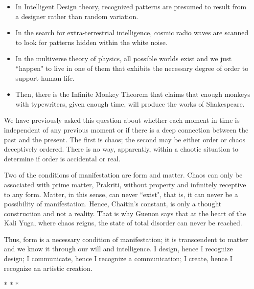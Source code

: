 \begin{itemize}
\item In Intelligent Design theory, recognized patterns are presumed to result from a designer rather than random
variation. 
\item In the search for extra-terrestrial intelligence, cosmic radio waves are scanned to look for patterns hidden
within the white noise. 
\item In the multiverse theory of physics, all possible worlds exist and we just ``happen" to live in one of them that
exhibits the necessary degree of order to support human life. 
\item Then, there is the Infinite Monkey Theorem that claims that enough monkeys with typewriters, given enough time,
will produce the works of Shakespeare. 
\end{itemize}
We have previously asked this question about whether each moment in time is independent of any previous moment or if
there is a deep connection between the past and the present. The first is chaos; the second may be either order or
chaos deceptively ordered. There is no way, apparently, within a chaotic situation to determine if order is accidental
or real.

Two of the conditions of manifestation are form and matter. Chaos can only be associated with prime matter, Prakriti,
without property and infinitely receptive to any form. Matter, in this sense, can never ``exist", that is, it can never
be a possibility of manifestation. Hence, Chaitin's constant, is only a thought construction and
not a reality. That is why Guenon says that at the heart of the Kali Yuga, where chaos reigns, the state of total
disorder can never be reached.

Thus, form is a necessary condition of manifestation; it is transcendent to matter and we know it through our will and
intelligence. I design, hence I recognize design; I communicate, hence I recognize a communication; I create, hence I
recognize an artistic creation.




\begin{center}* * *\end{center}

